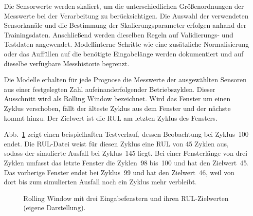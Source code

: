 Die Sensorwerte werden skaliert, um die unterschiedlichen Größenordnungen der Messwerte bei der Verarbeitung zu berücksichtigen. Die Auswahl der verwendeten Sensorkanäle und die Bestimmung der Skalierungsparameter erfolgen anhand der Trainingsdaten. Anschließend werden dieselben Regeln auf Validierungs- und Testdaten angewendet. Modellinterne Schritte wie eine zusätzliche Normalisierung oder das Auffüllen auf die benötigte Eingabelänge werden dokumentiert und auf dieselbe verfügbare Messhistorie begrenzt.

Die Modelle erhalten für jede Prognose die Messwerte der ausgewählten Sensoren aus einer festgelegten Zahl aufeinanderfolgender Betriebszyklen. Dieser Ausschnitt wird als Rolling Window bezeichnet. Wird das Fenster um einen Zyklus verschoben, fällt der älteste Zyklus aus dem Fenster und der nächste kommt hinzu. Der Zielwert ist die \ac{RUL} am letzten Zyklus des Fensters.

Abb.~\ref{fig:rolling-window} zeigt einen beispielhaften Testverlauf, dessen Beobachtung bei Zyklus~100 endet. Die RUL-Datei weist für diesen Zyklus eine RUL von 45 Zyklen aus, sodass der simulierte Ausfall bei Zyklus~145 liegt. Bei einer Fensterlänge von drei Zyklen umfasst das letzte Fenster die Zyklen~98 bis~100 und hat den Zielwert~45. Das vorherige Fenster endet bei Zyklus~99 und hat den Zielwert~46, weil von dort bis zum simulierten Ausfall noch ein Zyklus mehr verbleibt.

\begin{figure}[htbp]
    \centering
    \caption{Rolling Window mit drei Eingabefenstern und ihren RUL-Zielwerten (eigene Darstellung).}
    \label{fig:rolling-window}
\end{figure}

